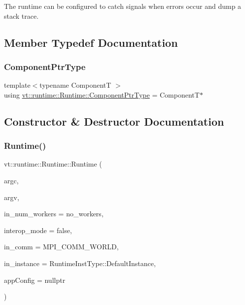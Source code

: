 The runtime can be configured to catch signals when errors occur and dump a stack trace. 

\subsection{Member Typedef Documentation}
\mbox{\label{structvt_1_1runtime_1_1_runtime_a0893bf0a8c03b898e8ab66b52cec80ad}} 
\subsubsection{\texorpdfstring{Component\+Ptr\+Type}{ComponentPtrType}}
{\footnotesize\ttfamily template$<$typename ComponentT $>$ \\
using \hyperlink{structvt_1_1runtime_1_1_runtime_a0893bf0a8c03b898e8ab66b52cec80ad}{vt\+::runtime\+::\+Runtime\+::\+Component\+Ptr\+Type} =  ComponentT$\ast$}



\subsection{Constructor \& Destructor Documentation}
\mbox{\label{structvt_1_1runtime_1_1_runtime_ad8bef210f0d845db8a7428f9477077a0}} 
\subsubsection{\texorpdfstring{Runtime()}{Runtime()}\hspace{0.1cm}{\footnotesize\ttfamily [1/3]}}
{\footnotesize\ttfamily vt\+::runtime\+::\+Runtime\+::\+Runtime (\begin{DoxyParamCaption}\item[{int \&}]{argc,  }\item[{char $\ast$$\ast$\&}]{argv,  }\item[{\hyperlink{namespacevt_aa93398ea48f2cb6c188512250f7cc248}{Worker\+Count\+Type}}]{in\+\_\+num\+\_\+workers = {\ttfamily no\+\_\+workers},  }\item[{bool const}]{interop\+\_\+mode = {\ttfamily false},  }\item[{M\+P\+I\+\_\+\+Comm}]{in\+\_\+comm = {\ttfamily MPI\+\_\+COMM\+\_\+WORLD},  }\item[{\hyperlink{namespacevt_1_1runtime_afca910c1b38b3975f7c1da8001a77d58}{Runtime\+Inst\+Type} const}]{in\+\_\+instance = {\ttfamily RuntimeInstType\+:\+:DefaultInstance},  }\item[{\hyperlink{structvt_1_1arguments_1_1_app_config}{arguments\+::\+App\+Config} const $\ast$}]{app\+Config = {\ttfamily nullptr} }\end{DoxyParamCaption})}



